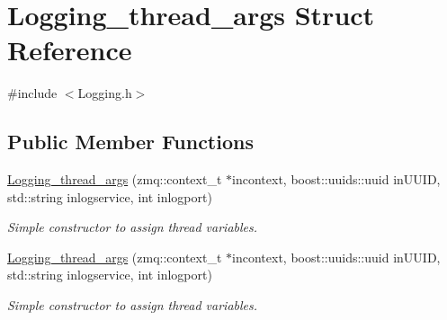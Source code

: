 \hypertarget{structLogging__thread__args}{\section{Logging\-\_\-thread\-\_\-args Struct Reference}
\label{structLogging__thread__args}
}


{\ttfamily \#include $<$Logging.\-h$>$}

\subsection*{Public Member Functions}
\begin{DoxyCompactItemize}
\item 
\hypertarget{structLogging__thread__args_a9496cec11539e17b104d3cbdf3174fdb}{\hyperlink{structLogging__thread__args_a9496cec11539e17b104d3cbdf3174fdb}{Logging\-\_\-thread\-\_\-args} (zmq\-::context\-\_\-t $\ast$incontext, boost\-::uuids\-::uuid in\-U\-U\-I\-D, std\-::string inlogservice, int inlogport)}\label{structLogging__thread__args_a9496cec11539e17b104d3cbdf3174fdb}

\begin{DoxyCompactList}\small\item\em Simple constructor to assign thread variables. \end{DoxyCompactList}\item 
\hypertarget{structLogging__thread__args_a9496cec11539e17b104d3cbdf3174fdb}{\hyperlink{structLogging__thread__args_a9496cec11539e17b104d3cbdf3174fdb}{Logging\-\_\-thread\-\_\-args} (zmq\-::context\-\_\-t $\ast$incontext, boost\-::uuids\-::uuid in\-U\-U\-I\-D, std\-::string inlogservice, int inlogport)}\label{structLogging__thread__args_a9496cec11539e17b104d3cbdf3174fdb}

\begin{DoxyCompactList}\small\item\em Simple constructor to assign thread variables. \end{DoxyCompactList}\end{DoxyCompactItemize}
